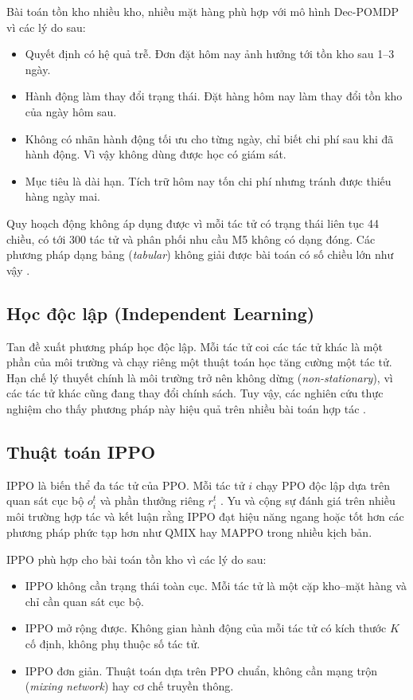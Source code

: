Bài toán tồn kho nhiều kho, nhiều mặt hàng phù hợp với mô hình Dec-POMDP vì các lý do sau:
\begin{itemize}
    \item Quyết định có hệ quả trễ. Đơn đặt hôm nay ảnh hưởng tới tồn kho sau 1--3 ngày.
    \item Hành động làm thay đổi trạng thái. Đặt hàng hôm nay làm thay đổi tồn kho của ngày hôm sau.
    \item Không có nhãn hành động tối ưu cho từng ngày, chỉ biết chi phí sau khi đã hành động. Vì vậy không dùng được học có giám sát.
    \item Mục tiêu là dài hạn. Tích trữ hôm nay tốn chi phí nhưng tránh được thiếu hàng ngày mai.
\end{itemize}

Quy hoạch động không áp dụng được vì mỗi tác tử có trạng thái liên tục 44 chiều, có tới 300 tác tử và phân phối nhu cầu M5 không có dạng đóng. Các phương pháp dạng bảng (\textit{tabular}) không giải được bài toán có số chiều lớn như vậy \parencite{bellman1957}.

\subsection{Học độc lập (Independent Learning)}
\label{subsec:hocDocLap}

Tan \cite{tan1993} đề xuất phương pháp học độc lập. Mỗi tác tử coi các tác tử khác là một phần của môi trường và chạy riêng một thuật toán học tăng cường một tác tử. Hạn chế lý thuyết chính là môi trường trở nên không dừng (\textit{non-stationary}), vì các tác tử khác cũng đang thay đổi chính sách. Tuy vậy, các nghiên cứu thực nghiệm cho thấy phương pháp này hiệu quả trên nhiều bài toán hợp tác \parencite{dewitt2020ippo}.

\subsection{Thuật toán IPPO}
\label{subsec:ippo}

IPPO là biến thể đa tác tử của PPO. Mỗi tác tử $i$ chạy PPO độc lập dựa trên quan sát cục bộ $o_i^t$ và phần thưởng riêng $r_i^t$ \parencite{dewitt2020ippo}. Yu và cộng sự \cite{yu2022mappo} đánh giá trên nhiều môi trường hợp tác và kết luận rằng IPPO đạt hiệu năng ngang hoặc tốt hơn các phương pháp phức tạp hơn như QMIX hay MAPPO trong nhiều kịch bản.

IPPO phù hợp cho bài toán tồn kho vì các lý do sau:
\begin{itemize}
    \item IPPO không cần trạng thái toàn cục. Mỗi tác tử là một cặp kho--mặt hàng và chỉ cần quan sát cục bộ.
    \item IPPO mở rộng được. Không gian hành động của mỗi tác tử có kích thước $K$ cố định, không phụ thuộc số tác tử.
    \item IPPO đơn giản. Thuật toán dựa trên PPO chuẩn, không cần mạng trộn (\textit{mixing network}) hay cơ chế truyền thông.
\end{itemize}

